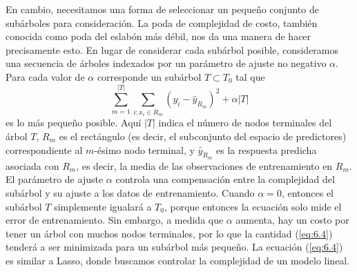 En cambio, necesitamos una forma de seleccionar un pequeño conjunto de subárboles para consideración. La poda de complejidad de costo, también conocida como poda del eslabón más débil, nos da una manera de hacer precisamente esto. En lugar de considerar cada subárbol posible, consideramos una secuencia de árboles indexados por un parámetro de ajuste no negativo $\alpha$. Para cada valor de $\alpha$ corresponde un subárbol $T \subset T_0$ tal que
\begin{equation}
\sum_{m=1}^{|T|} \sum_{i: x_i \in R_m} (y_i - \hat{y}_{R_m})^2 + \alpha |T|
\label{eq:6.4}
\end{equation} 
es lo más pequeño posible. Aquí $|T|$ indica el número de nodos terminales del árbol $T$, $R_m$ es el rectángulo (es decir, el subconjunto del espacio de predictores) correspondiente al $m$-ésimo nodo terminal, y $\hat{y}_{R_m}$ es la respuesta predicha asociada con $R_m$, es decir, la media de las observaciones de entrenamiento en $R_m$. \\

El parámetro de ajuste $\alpha$ controla una compensación entre la complejidad del subárbol y su ajuste a los datos de entrenamiento. Cuando $\alpha = 0$, entonces el subárbol $T$ simplemente igualará a $T_0$, porque entonces la ecuación solo mide el error de entrenamiento. Sin embargo, a medida que $\alpha$ aumenta, hay un costo por tener un árbol con muchos nodos terminales, por lo que la cantidad (\ref{eq:6.4}) tenderá a ser minimizada para un subárbol más pequeño. La ecuación (\ref{eq:6.4}) es similar a Lasso, donde buscamos controlar la complejidad de un modelo lineal. \\

